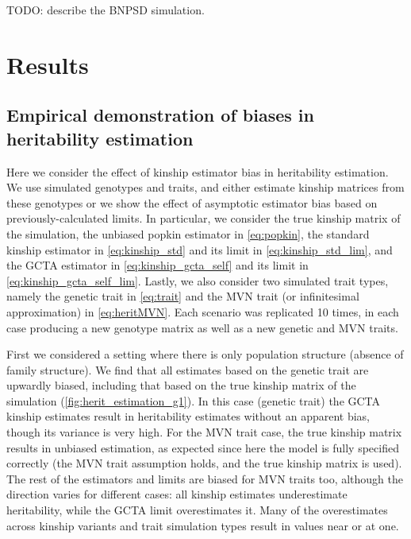 \documentclass[11pt]{article}
\begin{document}
TODO: describe the BNPSD simulation.

\section{Results}

\subsection{Empirical demonstration of biases in heritability estimation}

Here we consider the effect of kinship estimator bias in heritability estimation.
We use simulated genotypes and traits, and either estimate kinship matrices from these genotypes or we show the effect of asymptotic estimator bias based on previously-calculated limits.
In particular, we consider the true kinship matrix of the simulation,
the unbiased popkin estimator in \cref{eq:popkin},
the standard kinship estimator in \cref{eq:kinship_std}
and its limit in \cref{eq:kinship_std_lim},
and the GCTA estimator in \cref{eq:kinship_gcta_self} and its limit in \cref{eq:kinship_gcta_self_lim}.
Lastly, we also consider two simulated trait types, namely the genetic trait in \cref{eq:trait} and the MVN trait (or infinitesimal approximation) in \cref{eq:heritMVN}.
Each scenario was replicated 10 times, in each case producing a new genotype matrix as well as a new genetic and MVN traits.

First we considered a setting where there is only population structure (absence of family structure).
We find that all estimates based on the genetic trait are upwardly biased, including that based on the true kinship matrix of the simulation (\cref{fig:herit_estimation_g1}).
In this case (genetic trait) the GCTA kinship estimates result in heritability estimates without an apparent bias, though its variance is very high.
For the MVN trait case, the true kinship matrix results in unbiased estimation, as expected since here the model is fully specified correctly (the MVN trait assumption holds, and the true kinship matrix is used).
The rest of the estimators and limits are biased for MVN traits too, although the direction varies for different cases:
all kinship estimates underestimate heritability, while the GCTA limit overestimates it.
Many of the overestimates across kinship variants and trait simulation types result in values near or at one.
\end{document}
